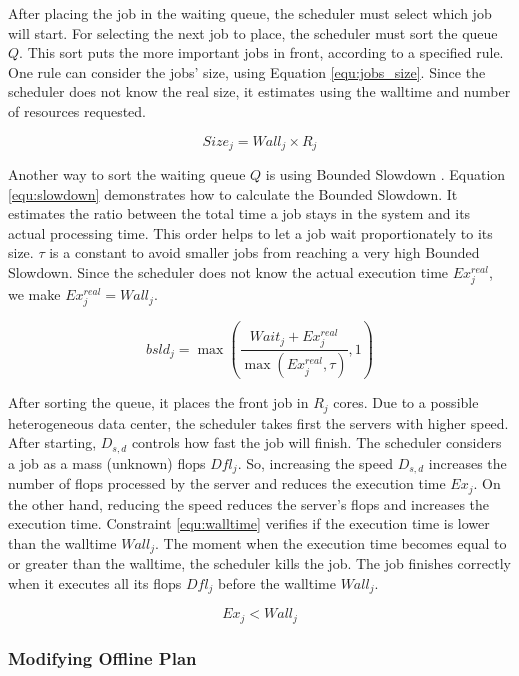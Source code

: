 After placing the job in the waiting queue, the scheduler must select which job will start. For selecting the next job to place, the scheduler must sort the queue $Q$. This sort puts the more important jobs in front, according to a specified rule. One rule can consider the jobs' size, using Equation \ref{equ:jobs_size}. Since the scheduler does not know the real size, it estimates using the walltime and number of resources requested.

\begin{equation}
    Size_j = Wall_j \times R_j
    \label{equ:jobs_size}
\end{equation}

Another way to sort the waiting queue $Q$ is using Bounded Slowdown \cite{feitelson1998metrics}. Equation \ref{equ:slowdown} demonstrates how to calculate the Bounded Slowdown. It estimates the ratio between the total time a job stays in the system and its actual processing time. This order helps to let a job wait proportionately to its size. $\tau$ is a constant to avoid smaller jobs from reaching a very high Bounded Slowdown. Since the scheduler does not know the actual execution time $Ex^{real}_j$, we make $Ex^{real}_j = Wall_j$.

\begin{equation}
    bsld_j = \max(\frac{Wait_j + Ex^{real}_j}{\max(Ex^{real}_j, \tau)}, 1)
    \label{equ:slowdown}
\end{equation}

After sorting the queue, it places the front job in $R_j$ cores. Due to a possible heterogeneous data center, the scheduler takes first the servers with higher speed. After starting, $D_{s,d}$ controls how fast the job will finish. The scheduler considers a job as a mass (unknown) flops $Dfl_j$. So, increasing the speed $D_{s,d}$ increases the number of flops processed by the server and reduces the execution time $Ex_j$. On the other hand, reducing the speed reduces the server's flops and increases the execution time. Constraint \ref{equ:walltime} verifies if the execution time is lower than the walltime $Wall_j$. The moment when the execution time becomes equal to or greater than the walltime, the scheduler kills the job. The job finishes correctly when it executes all its flops $Dfl_j$ before the walltime $Wall_j$. 

\begin{equation}
    Ex_j < Wall_j
    \label{equ:walltime}
\end{equation}

\subsubsection{Modifying Offline Plan}


